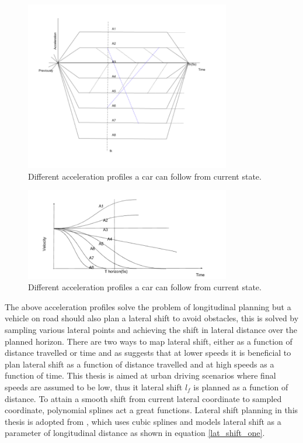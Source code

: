  \begin{figure}[H]
    \centering
    \includegraphics[width=0.8\textwidth]{Images/accelerations.png}
    \caption{Different acceleration profiles a car can follow from current state.}
    \label{accelerations}
\end{figure}

 \begin{figure}[H]
    \centering
    \includegraphics[width=0.8\textwidth]{Images/velcoities.png}
    \caption{Different acceleration profiles a car can follow from current state.}
    \label{velcoities}
\end{figure}


The above acceleration profiles solve the problem of longitudinal planning but a vehicle on road should also plan a lateral shift to avoid obstacles, this is solved by sampling various lateral points and achieving the shift in lateral distance over the planned horizon. There are two ways to map lateral shift, either as a function of distance travelled or time and as \cite{werling_frenet} suggests that at lower speeds it is beneficial to plan lateral shift as a function of distance travelled and at high speeds as a function of time. This thesis is aimed at urban driving scenarios where final speeds are assumed to be low, thus it lateral shift $ l_f $ is planned as a function of distance. To attain a smooth shift from current lateral coordinate to sampled coordinate, polynomial splines act a great functions. Lateral shift planning in this thesis is adopted from \cite{real_time_traj_plan_article}, which uses cubic splines and models lateral shift as a parameter of longitudinal distance as shown in equation \ref{lat_shift_one}.

